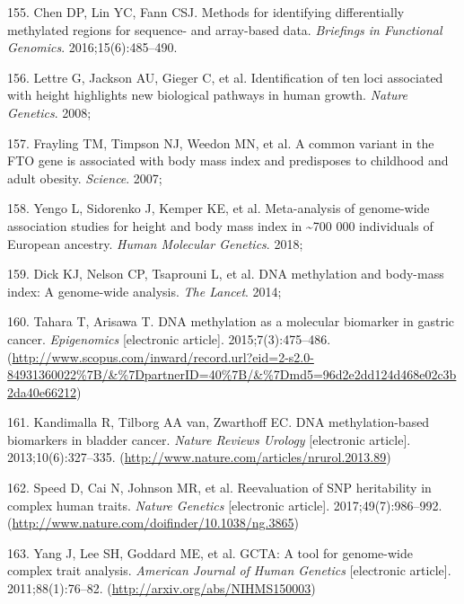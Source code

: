 \documentclass[11pt,oneside]{bristolthesis}
\newenvironment{cslreferences}%
  {}%
  {\par}
\begin{document}
\begin{cslreferences}
\leavevmode\hypertarget{ref-Chen2016}{}%
155. Chen DP, Lin YC, Fann CSJ. Methods for identifying differentially methylated regions for sequence- and array-based data. \emph{Briefings in Functional Genomics}. 2016;15(6):485--490.

\leavevmode\hypertarget{ref-Lettre2008}{}%
156. Lettre G, Jackson AU, Gieger C, et al. Identification of ten loci associated with height highlights new biological pathways in human growth. \emph{Nature Genetics}. 2008;

\leavevmode\hypertarget{ref-Frayling2007}{}%
157. Frayling TM, Timpson NJ, Weedon MN, et al. A common variant in the FTO gene is associated with body mass index and predisposes to childhood and adult obesity. \emph{Science}. 2007;

\leavevmode\hypertarget{ref-Yengo2018}{}%
158. Yengo L, Sidorenko J, Kemper KE, et al. Meta-analysis of genome-wide association studies for height and body mass index in \textasciitilde700 000 individuals of European ancestry. \emph{Human Molecular Genetics}. 2018;

\leavevmode\hypertarget{ref-Dick2014}{}%
159. Dick KJ, Nelson CP, Tsaprouni L, et al. DNA methylation and body-mass index: A genome-wide analysis. \emph{The Lancet}. 2014;

\leavevmode\hypertarget{ref-Tahara2015}{}%
160. Tahara T, Arisawa T. DNA methylation as a molecular biomarker in gastric cancer. \emph{Epigenomics} {[}electronic article{]}. 2015;7(3):475--486. (\url{http://www.scopus.com/inward/record.url?eid=2-s2.0-84931360022\%7B/\&\%7DpartnerID=40\%7B/\&\%7Dmd5=96d2e2dd124d468e02c3b2da40e66212})

\leavevmode\hypertarget{ref-Kandimalla2013}{}%
161. Kandimalla R, Tilborg AA van, Zwarthoff EC. DNA methylation-based biomarkers in bladder cancer. \emph{Nature Reviews Urology} {[}electronic article{]}. 2013;10(6):327--335. (\url{http://www.nature.com/articles/nrurol.2013.89})

\leavevmode\hypertarget{ref-Speed2017}{}%
162. Speed D, Cai N, Johnson MR, et al. Reevaluation of SNP heritability in complex human traits. \emph{Nature Genetics} {[}electronic article{]}. 2017;49(7):986--992. (\url{http://www.nature.com/doifinder/10.1038/ng.3865})

\leavevmode\hypertarget{ref-Yang2011}{}%
163. Yang J, Lee SH, Goddard ME, et al. GCTA: A tool for genome-wide complex trait analysis. \emph{American Journal of Human Genetics} {[}electronic article{]}. 2011;88(1):76--82. (\url{http://arxiv.org/abs/NIHMS150003})


\end{cslreferences}
\end{document}
